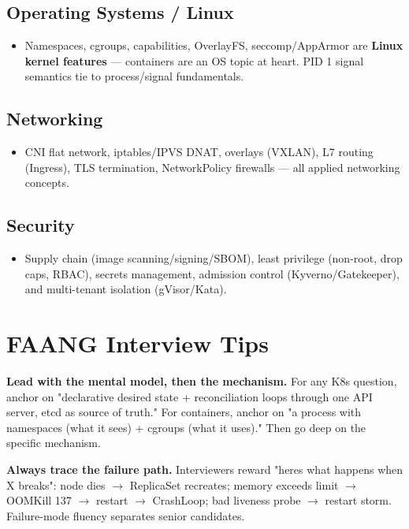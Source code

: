 \documentclass[11pt]{article}
\providecommand{\tightlist}{\setlength{\itemsep}{1pt}\setlength{\parskip}{0pt}}
\begin{document}
\subsection{Operating Systems / Linux}\label{operating-systems--linux}

\begin{itemize}
\tightlist
\item
  Namespaces, cgroups, capabilities, OverlayFS, seccomp/AppArmor are \textbf{Linux kernel features} --- containers are an OS topic at heart. PID 1 signal semantics tie to process/signal fundamentals.
\end{itemize}

\subsection{Networking}\label{networking}

\begin{itemize}
\tightlist
\item
  CNI flat network, iptables/IPVS DNAT, overlays (VXLAN), L7 routing (Ingress), TLS termination, NetworkPolicy firewalls --- all applied networking concepts.
\end{itemize}

\subsection{Security}\label{security}

\begin{itemize}
\tightlist
\item
  Supply chain (image scanning/signing/SBOM), least privilege (non-root, drop caps, RBAC), secrets management, admission control (Kyverno/Gatekeeper), and multi-tenant isolation (gVisor/Kata).
\end{itemize}

\section{FAANG Interview Tips}\label{faang-interview-tips}

\textbf{Lead with the mental model, then the mechanism.} For any K8s question, anchor on "declarative desired state + reconciliation loops through one API server, etcd as source of truth." For containers, anchor on "a process with namespaces (what it sees) + cgroups (what it uses)." Then go deep on the specific mechanism.

\textbf{Always trace the failure path.} Interviewers reward "here\textquotesingle s what happens when X breaks": node dies \(\rightarrow\) ReplicaSet recreates; memory exceeds limit \(\rightarrow\) OOMKill 137 \(\rightarrow\) restart \(\rightarrow\) CrashLoop; bad liveness probe \(\rightarrow\) restart storm. Failure-mode fluency separates senior candidates.
\end{document}
